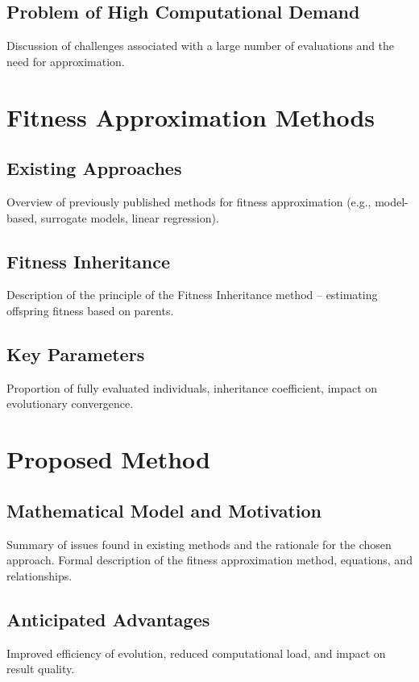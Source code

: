 \documentclass[12pt,a4paper]{report}
\begin{document}
\section{Problem of High Computational Demand}
\label{sec:high-computational-demand}
Discussion of challenges associated with a large number of evaluations and the need for approximation.

\chapter{Fitness Approximation Methods}
\label{chap:fitness-approximation}

\section{Existing Approaches}
\label{sec:existing-approaches}
Overview of previously published methods for fitness approximation (e.g., model-based, surrogate models, linear regression).

\section{Fitness Inheritance}
\label{sec:fitness-inheritance}
Description of the principle of the Fitness Inheritance method – estimating offspring fitness based on parents.

\section{Key Parameters}
\label{sec:key-parameters}
Proportion of fully evaluated individuals, inheritance coefficient, impact on evolutionary convergence.

\chapter{Proposed Method}
\label{chap:proposed-method}

\section{Mathematical Model and Motivation}
\label{sec:mathematical-model-motivation}
Summary of issues found in existing methods and the rationale for the chosen approach. Formal description of the fitness approximation method, equations, and relationships.

\section{Anticipated Advantages}
\label{sec:anticipated-advantages}
Improved efficiency of evolution, reduced computational load, and impact on result quality.
\end{document}
